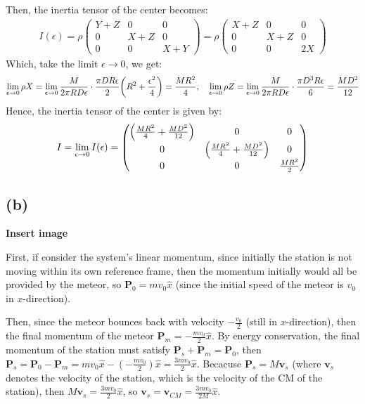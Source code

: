 \documentclass{article}
\DeclarePairedDelimiter{\paran}{(}{)}%
\newcommand{\bv}{\textbf{v}} %
\newcommand{\bP}{\textbf{P}} %
\begin{document}
Then, the inertia tensor of the center becomes:
\begin{align}
    I(\epsilon)=\rho\begin{pmatrix}
        Y+Z&0&0\\
        0&X+Z&0\\
        0&0&X+Y
    \end{pmatrix}=\rho\begin{pmatrix}
        X+Z&0&0\\
        0&X+Z&0\\
        0&0&2X
    \end{pmatrix}
\end{align}
Which, take the limit $\epsilon\rightarrow 0$, we get:
\begin{align}
    \lim_{\epsilon\rightarrow 0}\rho X=\lim_{\epsilon\rightarrow 0}\frac{M}{2\pi RD\epsilon}\cdot \frac{\pi DR\epsilon}{2}\paran*{R^2+\frac{\epsilon^2}{4}}=\frac{MR^2}{4},\quad \lim_{\epsilon\rightarrow 0}\rho Z=\lim_{\epsilon\rightarrow 0}\frac{M}{2\pi RD\epsilon}\cdot\frac{\pi D^3R\epsilon}{6}=\frac{MD^2}{12}
\end{align}
Hence, the inertia tensor of the center is given by:
\begin{align}
    I = \lim_{\epsilon\rightarrow 0}I(\epsilon) = \begin{pmatrix}
        \paran*{\frac{MR^2}{4}+\frac{MD^2}{12}}&0&0\\
        0&\paran*{\frac{MR^2}{4}+\frac{MD^2}{12}}&0\\
        0&0& \frac{MR^2}{2}
    \end{pmatrix}
\end{align}

\subsection*{(b)}
\textbf{Insert image}

First, if consider the system's linear momentum, since initially the station is not moving within its own reference frame, then the momentum initially would all be provided by the meteor, so $\bP_0 = mv_0\hat{x}$ (since the initial speed of the meteor is $v_0$ in $x$-direction).

Then, since the meteor bounces back with velocity $-\frac{v_0}{2}$ (still in $x$-direction), then the final momentum of the meteor $\bP_m = -\frac{mv_0}{2}\hat{x}$. By energy conservation, the final momentum of the station must satisfy $\bP_s + \bP_m = \bP_0$, then $\bP_s = \bP_0-\bP_m = mv_0\hat{x}-(-\frac{mv_0}{2})\hat{x} = \frac{3mv_0}{2}\hat{x}$. Becacuse $\bP_s= M\bv_s$ (where $\bv_s$ denotes the velocity of the station, which is the velocity of the CM of the station), then $M\bv_s = \frac{3mv_0}{2}\hat{x}$, so $\bv_s = \bv_{CM} = \frac{3mv_0}{2M}\hat{x}$.
\end{document}

